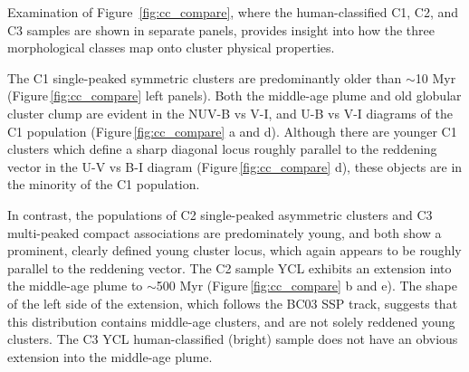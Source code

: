\documentclass[linenumbers]{aastex63}
\begin{document}
Examination of Figure~\ref{fig:cc_compare}, where the human-classified C1, C2, and C3 samples are shown in separate panels, provides insight into how the three morphological classes map onto cluster physical properties.  

The C1 single-peaked symmetric clusters are predominantly older than $\sim$10 Myr (Figure\,\ref{fig:cc_compare} left panels).  Both the middle-age plume and old globular cluster clump are evident in the NUV-B vs V-I, and U-B vs V-I diagrams of the C1 population (Figure\,\ref{fig:cc_compare} a and d). %
Although there are younger C1 clusters which define a sharp diagonal locus roughly parallel to the reddening vector in the U-V vs B-I diagram (Figure\,\ref{fig:cc_compare} d), these objects are in the minority of the C1 population.  

In contrast, the populations of C2 single-peaked asymmetric clusters and C3 multi-peaked compact associations are predominately young, and both show a prominent, clearly defined young cluster locus, which again appears to be roughly parallel to the reddening vector.  The C2 sample YCL exhibits an extension into the middle-age plume to $\sim$500 Myr (Figure\,\ref{fig:cc_compare} b and e).  The shape of the left side of the extension, which follows the BC03 SSP track, suggests that this distribution contains middle-age clusters, and are not solely reddened young clusters.  The C3 YCL human-classified (bright) sample does not have an obvious extension into the middle-age plume.
\end{document}
